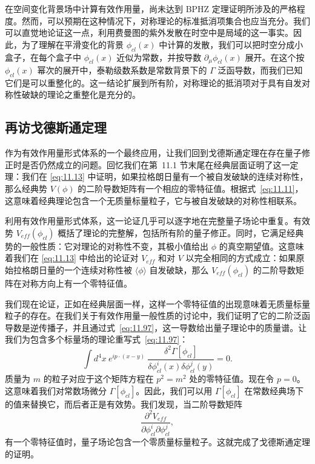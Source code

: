在空间变化背景场中计算有效作用量，尚未达到 BPHZ 定理证明所涉及的严格程度。然而，可以预期在这种情况下，对称理论的标准抵消项集合也应当充分。我们可以直觉地论证这一点，利用费曼图的紫外发散在时空中是局域的这一事实。因此，为了理解在平滑变化的背景 $\phi_{cl}(x)$ 中计算的发散，我们可以把时空分成小盒子，在每个盒子中 $\phi_{cl}(x)$ 近似为常数，并按导数 $\partial_\mu\phi_{cl}(x)$ 展开。在这个按 $\phi_{cl}(x)$ 幂次的展开中，泰勒级数系数是常数背景下的 $\Gamma$ 泛函导数，而我们已知它们是可以重整化的。这一结论扩展到所有阶，对称理论的抵消项对于具有自发对称性破缺的理论之重整化是充分的。

\subsection{再访戈德斯通定理}

作为有效作用量形式体系的一个最终应用，让我们回到戈德斯通定理在存在量子修正时是否仍然成立的问题。回忆我们在第~11.1 节末尾在经典层面证明了这一定理：我们在 \eqref{eq:11.13} 中证明，如果拉格朗日量有一个被自发破缺的连续对称性，那么经典势 $V(\phi)$ 的二阶导数矩阵有一个相应的零特征值。根据式~\eqref{eq:11.11}，这意味着经典理论包含一个无质量标量粒子，它与被自发破缺的对称性相联系。

利用有效作用量形式体系，这一论证几乎可以逐字地在完整量子场论中重复。有效势 $V_{eff}(\phi_{cl})$ 概括了理论的完整解，包括所有阶的量子修正。同时，它满足经典势的一般性质：它对理论的对称性不变，其极小值给出 $\phi$ 的真空期望值。这意味着我们在 \eqref{eq:11.13} 中给出的论证对 $V_{eff}$ 和对 $V$ 以完全相同的方式成立：如果原始拉格朗日量的一个连续对称性被 $\langle\phi\rangle$ 自发破缺，那么 $V_{eff}(\phi_{cl})$ 的二阶导数矩阵在对称方向上有一个零特征值。

我们现在论证，正如在经典层面一样，这样一个零特征值的出现意味着无质量标量粒子的存在。在我们关于有效作用量一般性质的讨论中，我们证明了它的二阶泛函导数是逆传播子，并且通过式~\eqref{eq:11.97}，这一导数给出量子理论中的质量谱。让我们为包含多个标量场的理论重写式~\eqref{eq:11.97}：
\begin{equation}
  \int d^4x\ e^{ip\cdot(x-y)}\ \frac{\delta^2\Gamma[\phi_{cl}]}
    {\delta\phi^i_{cl}(x)\delta\phi^j_{cl}(y)} = 0 .
  \label{eq:11.105}
\end{equation}
质量为 $m$ 的粒子对应于这个矩阵方程在 $p^2 = m^2$ 处的零特征值。现在令 $p = 0$。这意味着我们对常数场微分 $\Gamma[\phi_{cl}]$。因此，我们可以用 $\Gamma[\phi_{cl}]$ 在常数经典场下的值来替换它，而后者正是有效势。我们发现，当二阶导数矩阵
\begin{equation}
  \frac{\partial^2 V_{eff}}{\partial\phi^i_{cl}\partial\phi^j_{cl}} ,
\end{equation}
有一个零特征值时，量子场论包含一个零质量标量粒子。这就完成了戈德斯通定理的证明。

